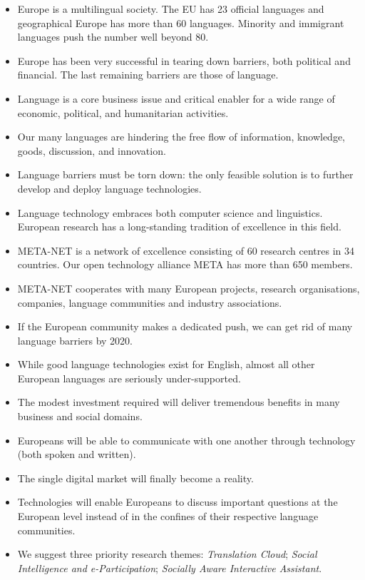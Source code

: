 \documentclass[10pt, plain]{../../metanetpaper}
\begin{document}
\vspace*{-6mm}
\begin{multicols}{2}
  \begin{itemize}
  \item Europe is a multilingual society. The EU has 23 official languages and geographical Europe has more than 60 languages. Minority and immigrant languages push the number well beyond 80.
  \item Europe has been very successful in tearing down barriers, both political and financial. The last remaining barriers are those of language.
  \item Language is a core business issue and critical enabler for a wide range of economic, political, and humanitarian activities.
  \item Our many languages are hindering the free flow of information, knowledge, goods, discussion, and innovation. 
  \item Language barriers must be torn down: the only feasible solution is to further develop and deploy language technologies.
  \item Language technology embraces both computer science and linguistics. European research has a long-standing tradition of excellence in this field.
  \item META-NET is a network of excellence consisting of 60 research centres in 34 countries. Our open technology alliance META has more than 650 members.
  \item META-NET cooperates with many European projects, research organisations, companies, language communities and industry associations.
  \item If the European community makes a dedicated push, we can get rid of many language barriers by 2020.
  \item While good language technologies exist for English, almost all other European languages are seriously under-supported.
  \item The modest investment required will deliver tremendous benefits in many business and social domains.
  \item Europeans will be able to communicate with one another through technology (both spoken and written).
  \item The single digital market will finally become a reality.
  \item Technologies will enable Europeans to discuss important questions at the European level instead of in the confines of their respective language communities.
  \item We suggest three priority research themes: \emph{Translation Cloud}; \emph{Social Intelligence and e-Participation}; \emph{Socially Aware Interactive Assistant}.

\end{itemize}
\end{multicols}
\end{document}
